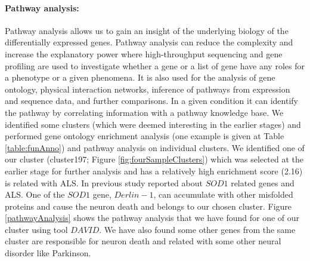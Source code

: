 \paragraph{Pathway analysis:}
Pathway analysis allows us to gain an insight of the underlying
biology of the differentially expressed genes. Pathway analysis can
reduce the complexity and increase the explanatory power where
high-throughput sequencing and gene profiling are used to investigate
whether a gene or a list of gene have any roles for a phenotype or a
given phenomena. It is also used for the analysis of gene ontology,
physical interaction networks, inference of pathways from expression
and sequence data, and further comparisons. In a given condition it
can identify the pathway by correlating information with a pathway
knowledge base. We identified some clusters (which were deemed
interesting in the earlier stages) and performed gene ontology
enrichment analysis (one example is given at Table
\ref{table:funAnno}) and pathway analysis on individual clusters.  We
identified one of our cluster (cluster197; Figure
\ref{fig:fourSampleClusters}) which was selected at the earlier stage
for further analysis and has a relatively high enrichment score (2.16)
is related with ALS.  In previous study \cite{Brockington:2013}
reported about $SOD1$ related genes and ALS.  One of the $SOD1$
gene, $Derlin-1$, can accumulate with other misfolded
proteins and cause the neuron death and belongs to our chosen
cluster. Figure \ref{pathwayAnalysis} shows the pathway analysis that
we have found for one of our cluster using tool $DAVID$.  We have also
found some other genes from the same cluster are responsible for
neuron death and related with some other neural disorder like
Parkinson.

